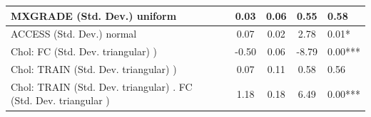 \begin{table}
\begin{center}
\begin{tabular}{|l|l|c|c|c|l|}
			\hline
			MXGRADE (Std. Dev.) uniform &  & 0.03 & 0.06 & 0.55 & 0.58 \\
			\hline
			ACCESS (Std. Dev.) normal &  & 0.07 & 0.02 & 2.78 & 0.01* \\
			\hline
			 Chol: FC (Std. Dev. triangular) ) &  & -0.50 & 0.06 & -8.79 & 0.00*** \\
			\hline
			 Chol: TRAIN (Std. Dev. triangular) ) &  & 0.07 & 0.11 & 0.58 & 0.56 \\
			\hline
			 Chol: TRAIN (Std. Dev. triangular) . FC (Std. Dev.   triangular ) &  & 1.18 & 0.18 & 6.49 & 0.00*** \\
			\hline
		\end{tabular}
	\end{center}
\end{table}